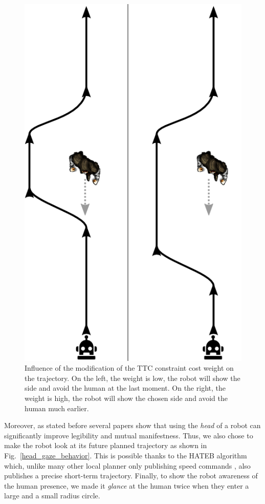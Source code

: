 \documentclass[a4paper,11pt,twoside]{StyleThese}
\begin{document}
\begin{figure}[hbtp]
\centering
\includegraphics[scale=0.4]{figures/chapter2/condition_1_proactivity_shrink.png}
\caption{Influence of the modification of the TTC constraint cost weight on the trajectory. On the left, the weight is low, the robot will show the side and avoid the human at the last moment. On the right, the weight is high, the robot will show the chosen side and avoid the human much earlier.}
\label{ttc_explanations}
\end{figure}

Moreover, as stated before  several papers show that using the \textit{head} of a robot can significantly improve legibility and mutual manifestness. Thus, we also chose to make the robot look at its future planned trajectory as shown in Fig.~\ref{head_gaze_behavior}. This is possible thanks to the HATEB algorithm which, unlike many other local planner only publishing  speed commands , also publishes a precise short-term trajectory. Finally, to show the robot awareness of the human presence, we made it \textit{glance} at the human twice when they enter a large and a small radius circle.
\end{document}
